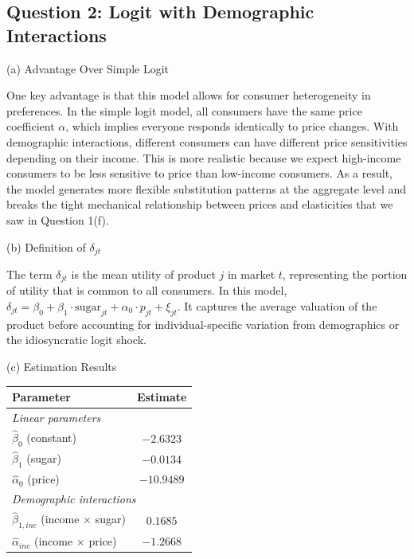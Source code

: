 \documentclass[11pt]{article}
\begin{document}
\newpage
\subsection*{Question 2: Logit with Demographic Interactions}

(a) Advantage Over Simple Logit

One key advantage is that this model allows for consumer heterogeneity in preferences. In the simple logit model, all consumers have the same price coefficient $\alpha$, which implies everyone responds identically to price changes. With demographic interactions, different consumers can have different price sensitivities depending on their income. This is more realistic because we expect high-income consumers to be less sensitive to price than low-income consumers. As a result, the model generates more flexible substitution patterns at the aggregate level and breaks the tight mechanical relationship between prices and elasticities that we saw in Question 1(f).

\vspace{1em}
(b) Definition of $\delta_{jt}$

The term $\delta_{jt}$ is the mean utility of product $j$ in market $t$, representing the portion of utility that is common to all consumers. In this model, $\delta_{jt} = \beta_0 + \beta_1 \cdot \text{sugar}_{jt} + \alpha_0 \cdot p_{jt} + \xi_{jt}$. It captures the average valuation of the product before accounting for individual-specific variation from demographics or the idiosyncratic logit shock.

\vspace{1em}
(c) Estimation Results

\begin{center}
\begin{tabular}{lc}
\toprule
Parameter & Estimate \\
\midrule
\multicolumn{2}{l}{\textit{Linear parameters}} \\
$\hat{\beta}_0$ (constant) & $-2.6323$ \\
$\hat{\beta}_1$ (sugar) & $-0.0134$ \\
$\hat{\alpha}_0$ (price) & $-10.9489$ \\
\midrule
\multicolumn{2}{l}{\textit{Demographic interactions}} \\
$\hat{\beta}_{1,inc}$ (income $\times$ sugar) & $0.1685$ \\
$\hat{\alpha}_{inc}$ (income $\times$ price) & $-1.2668$ \\
\bottomrule
\end{tabular}
\end{center}
\end{document}
